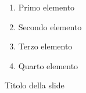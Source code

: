 \documentclass{beamer}
\begin{document}
\begin{frame}
    \begin{enumerate}
         \item Primo elemento
         \item Secondo elemento
          \item Terzo elemento
          \item Quarto elemento
    \end{enumerate}
\end{frame}

\begin{frame}
\end{frame}

\begin{frame}{Titolo della slide}
    \begin{enumerate}
    \end{enumerate}
\end{frame}
\end{document}
